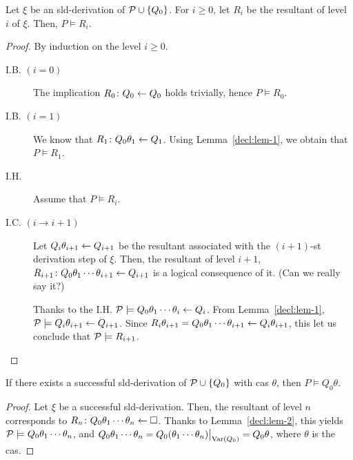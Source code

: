 \begin{lem}
    \label{decl:lem-2}
    Let \(\xi\) be an \gls{sld}-derivation of \(\mathcal{P} \cup \lbrace Q_0 \rbrace\).
    For \(i \ge 0\), let \(R_i\) be the resultant of level \(i\) of \(\xi\).
    Then, \(P \models R_i\).
\end{lem}
\begin{proof}
    By induction on the level \(i \ge 0\).
    \begin{description}
        \item[I.B. \((i = 0)\)] The implication \(R_0 \colon Q_0 \leftarrow Q_0\) holds trivially, hence \(P \models R_0\).
        \item[I.B. \((i = 1)\)] We know that \(R_1 \colon Q_0\theta_1 \leftarrow Q_1\). Using Lemma~\ref{decl:lem-1}, we obtain that \(P \models R_1\).
        \item[I.H.] Assume that \(P \models R_i\).
        \item[I.C. \((i \to i+1)\)] Let \(Q_i\theta_{i+1} \leftarrow Q_{i+1}\) be the resultant associated with the \((i+1)\)-st derivation step of \(\xi\).
        Then, the resultant of level \(i+1\), \(R_{i+1} \colon Q_0\theta_1\dotsb\theta_{i+1} \leftarrow Q_{i+1}\) is a logical consequence of it. (Can we really say it?)

        Thanks to the I.H. \(\mathcal{P} \models Q_0\theta_1\dotsb\theta_i \leftarrow Q_i\).
        From Lemma~\ref{decl:lem-1}, \(\mathcal{P} \models Q_i\theta_{i+1} \leftarrow Q_{i+1}\).
        Since \(R_i\theta_{i+1} = Q_0\theta_1\dotsb\theta_{i+1} \leftarrow Q_i\theta_{i+1}\), this let us conclude that \(\mathcal{P} \models R_{i+1}\). 
    \end{description}
\end{proof}

\begin{thm}
    \label{sld:sound}
    If there exists a successful \gls{sld}-derivation of \(\mathcal{P} \cup \lbrace Q_0 \rbrace\) with \gls{cas} \(\theta\), then \(P \models Q_0\theta\).
\end{thm}
\begin{proof}
    Let \(\xi\) be a successful \gls{sld}-derivation.
    Then, the resultant of level \(n\) corresponds to \(R_n \colon Q_0\theta_1\dotsb\theta_n \leftarrow \square\).
    Thanks to Lemma~\ref{decl:lem-2}, this yields \(\mathcal{P} \models Q_0\theta_1\dotsb\theta_n\), and \(Q_0\theta_1\dotsb\theta_n = Q_0\restr{(\theta_1\dotsb\theta_n)}{\Var(Q_0)} = Q_0\theta\), where \(\theta\) is the \gls{cas}.
\end{proof}

